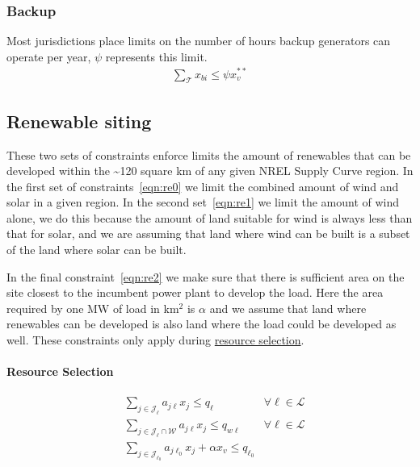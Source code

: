 \documentclass[9pt, oneside]{article}
\numberwithin{equation}{subsubsection}
\begin{document}
\subsubsection{Backup}\label{subsec:backup}
Most jurisdictions place limits on the number of hours backup generators can operate per year, $\psi$ represents this limit.
\begin{subequations}
	\begin{align}
		 & \sum_{\mathcal{T}} x_{bi} \leq \psi x_v^{**} & \label{eqn:backup}
	\end{align}
\end{subequations}

\subsection{Renewable siting}\label{subsec:renewable-siting}
These two sets of constraints enforce limits the amount of renewables that can be developed within the \textasciitilde{}120 square km of any given NREL Supply Curve region.
In the first set of constraints~\ref{eqn:re0} we limit the combined amount of wind and solar in a given region.
In the second set~\ref{eqn:re1} we limit the amount of wind alone, we do this because the amount of land suitable for wind is always less than that for solar, and we are assuming that land where wind can be built is a subset of the land where solar can be built.

In the final constraint~\ref{eqn:re2} we make sure that there is sufficient area on the site closest to the incumbent power plant to develop the load.
Here the area required by one MW of load in km$^2$ is $\alpha$ and we assume that land where renewables can be developed is also land where the load could be developed as well.
These constraints only apply during \hyperref[sec:res]{resource selection}.

\paragraph{Resource Selection}
\begin{subequations}
	\begin{align}
		 & \sum_{j \in \mathcal{J}_{\ell}} a_{j \ell} x_j \leq q_{\ell}                                     & \forall \ell \in \mathcal{L} \label{eqn:re0} \\
		 & \sum_{j \in \mathcal{J}_{\ell} \cap \mathcal{W}} a_{j \ell} x_j \leq q_{w \ell}                  & \forall \ell \in \mathcal{L}\label{eqn:re1}  \\
		 & \sum_{j \in \mathcal{J}_{\ell_0} } a_{j \ell_0} x_j + \alpha x_v \leq q_{\ell_0} \label{eqn:re2}
	\end{align}
\end{subequations}
\end{document}
